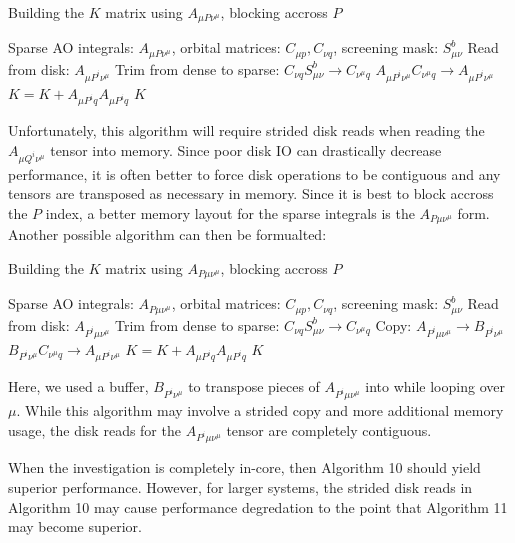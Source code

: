 \begin{algorithm}[H]
\caption{Building the $K$ matrix using $A_{\mu P \nu^\mu}$, blocking accross $P$}
\begin{algorithmic}
\REQUIRE Sparse AO integrals: $A_{\mu P \nu^\mu}$, orbital matrices: $C_{\mu p}, C_{\nu q}$, screening mask: $S_{\mu \nu}^b$
    \STATE Read from disk: $A_{\mu P^i \nu^{\mu}}$
        \STATE Trim from dense to sparse: $C_{\nu q}S_{\mu \nu}^b \rightarrow C_{\nu^{\mu} q}$
        \STATE $A_{\mu P^i \nu^{\mu}} C_{\nu^{\mu} q} \rightarrow A_{\mu P^i \nu^{\mu}}$
    \ENDFOR
    \STATE $K = K +  A_{\mu P^i q} A_{\mu P^i q} $
\ENDFOR
\RETURN $K$
\end{algorithmic}
\end{algorithm}

\noindent Unfortunately, this algorithm will require strided disk reads when reading the $A_{\mu Q^i \nu^{\mu}}$ tensor into memory.
Since poor disk IO can drastically decrease performance, it is often better to force disk operations 
to be contiguous and any tensors are transposed as necessary in memory. Since it is best to block accross the $P$ index, a better
memory layout for the sparse integrals is the $A_{P \mu \nu^\mu}$ form. Another possible algorithm can then be formualted:

\begin{algorithm}[H]
\caption{Building the $K$ matrix using $A_{P \mu \nu^\mu}$, blocking accross $P$}
\begin{algorithmic}
\REQUIRE Sparse AO integrals: $A_{P \mu \nu^\mu}$, orbital matrices: $C_{\mu p}, C_{\nu q}$, screening mask: $S_{\mu \nu}^b$
    \STATE Read from disk: $A_{P^i \mu \nu^{\mu}}$
        \STATE Trim from dense to sparse: $C_{\nu q}S_{\mu \nu}^b \rightarrow C_{\nu^{\mu} q}$
        \STATE Copy: $A_{P^i \mu \nu^{\mu}} \rightarrow B_{P^i \nu^{\mu}}$
        \STATE $B_{P^i \nu^{\mu}} C_{\nu^{\mu} q} \rightarrow A_{\mu P^i \nu^{\mu}}$
    \ENDFOR
    \STATE $K = K +  A_{\mu P^i q} A_{\mu P^i q} $
\ENDFOR
\RETURN $K$
\end{algorithmic}
\end{algorithm}

\noindent Here, we used a buffer, $B_{P^i \nu^{\mu}}$ to transpose pieces of $A_{P^i \mu \nu^{\mu}}$ into while looping over $\mu$.
While this algorithm may involve a strided copy and more additional memory usage, the disk reads for the $A_{P^i \mu \nu^{\mu}}$ 
tensor are completely contiguous.  

When the investigation is completely in-core, then Algorithm 10 should yield superior performance. However, for larger systems,
the strided disk reads in Algorithm 10 may cause performance degredation to the point that Algorithm 11 may become superior.
 
